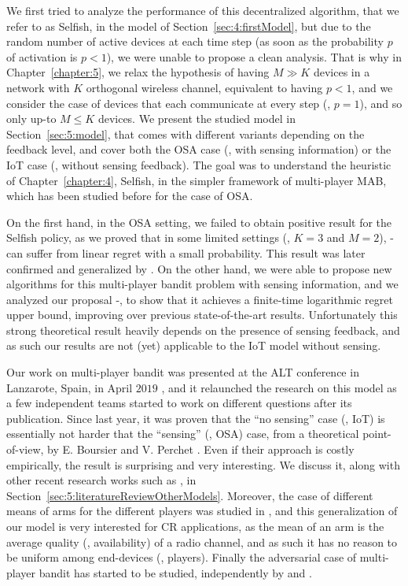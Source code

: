 We first tried to analyze the performance of this decentralized algorithm, that we refer to as Selfish, in the model of Section~\ref{sec:4:firstModel},
but due to the random number of active devices at each time step (as soon as the probability $p$ of activation is $p < 1$), we were unable to propose a clean analysis.
%
That is why in Chapter~\ref{chapter:5}, we relax the hypothesis of having $M \gg K$ devices in a network with $K$ orthogonal wireless channel, equivalent to having $p < 1$, and we consider the case of devices that each communicate at every step (\ie, $p=1$), and so only up-to $M \leq K$ devices.
We present the studied model in Section~\ref{sec:5:model}, that comes with different variants depending on the feedback level, and cover both the OSA case (\ie, with sensing information) or the IoT case (\ie, without sensing feedback).
The goal was to understand the heuristic of Chapter~\ref{chapter:4}, Selfish, in the simpler framework of multi-player MAB, which has been studied before \cite{Zhao10,Anandkumar10,Anandkumar11} for the case of OSA.

On the first hand, in the OSA setting, we failed to obtain positive result for the Selfish policy, as we proved that in some limited settings (\eg, $K=3$ and $M=2$), \Selfish-\UCB{} can suffer from linear regret with a small probability. This result was later confirmed and generalized by \cite{BoursierPerchet18}.
%
On the other hand, we were able to propose new algorithms for this multi-player bandit problem with sensing information, and we analyzed our proposal \MCTopM-\klUCB, to show that it achieves a finite-time logarithmic regret upper bound, improving over previous state-of-the-art results.
%
Unfortunately this strong theoretical result heavily depends on the presence of sensing feedback, and as such our results are not (yet) applicable to the IoT model without sensing.

Our work on multi-player bandit was presented at the ALT conference in Lanzarote, Spain, in April $2019$ \cite{Besson2018ALT},
%
%
and it relaunched the research on this model as a few independent teams started to work on different questions after its publication.
%
Since last year, it was proven that the ``no sensing'' case (\ie, IoT) is essentially not harder that the ``sensing'' (\ie, OSA) case, from a theoretical point-of-view, by E. Boursier and V. Perchet \cite{BoursierPerchet18}.
Even if their approach is costly empirically, the result is surprising and very interesting.
We discuss it, along with other recent research works such as \cite{LugosiMehrabian18}, in Section~\ref{sec:5:literatureReviewOtherModels}.
%
Moreover, the case of different means of arms for the different players was studied in \cite{KaufmannAbbas19}, and this generalization of our model is very interested for CR applications, as the mean of an arm is the average quality (\eg, availability) of a radio channel, and as such it has no reason to be uniform among end-devices (\ie, players).
%
Finally the adversarial case of multi-player bandit has started to be studied, independently by \cite{bande2019adversarial} and \cite{AlaturLevyKrause19}.

